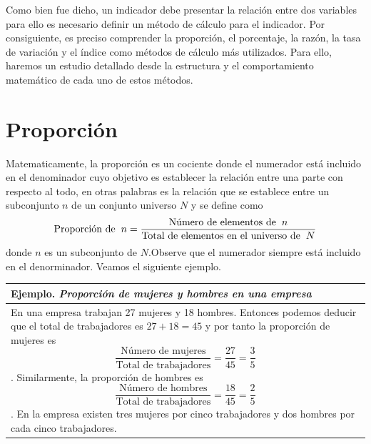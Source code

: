 \documentclass[
]{book}
\begin{document}
Como bien fue dicho, un indicador debe presentar la relación entre dos variables para ello es necesario definir un método de cálculo para el indicador. Por consiguiente, es preciso comprender la proporción, el porcentaje, la razón, la tasa de variación y el índice como métodos de cálculo más utilizados. Para ello, haremos un estudio detallado desde la estructura y el comportamiento matemático de cada uno de estos métodos.

\hypertarget{proporciuxf3n}{%
\chapter{Proporción}\label{proporciuxf3n}}

Matematicamente, la proporción es un cociente donde el numerador está incluido en el denominador cuyo objetivo es establecer la relación entre una parte con respecto al todo, en otras palabras es la relación que se establece entre un subconjunto \(n\) de un conjunto universo \(N\) y se define como
\[\begin{equation}
\text{Proporción de}\hspace{2mm}n=\frac{\text{Número de elementos de}\hspace{2mm}n}{\text{Total de elementos en el universo de}\hspace{2mm} N}
\end{equation}\]
donde \(n\) es un subconjunto de \(N\).Observe que el numerador siempre está incluido en el denorminador. Veamos el siguiente ejemplo.

\begin{longtable}[]{@{}l@{}}
\toprule
\begin{minipage}[b]{0.97\columnwidth}\raggedright
Ejemplo. \emph{Proporción de mujeres y hombres en una empresa}\strut
\end{minipage}\tabularnewline
\midrule
\endhead
\begin{minipage}[t]{0.97\columnwidth}\raggedright
En una empresa trabajan 27 mujeres y 18 hombres. Entonces podemos deducir que el total de trabajadores es \(27+18=45\) y por tanto la proporción de mujeres es \[\frac{\text{Número de mujeres}}{\text{Total de trabajadores}}=\frac{27}{45}=\frac{3}{5}\]. Similarmente, la proporción de hombres es \[\frac{\text{Número de hombres}}{\text{Total de trabajadores}}=\frac{18}{45}=\frac{2}{5}\]. En la empresa existen tres mujeres por cinco trabajadores y dos hombres por cada cinco trabajadores.\strut
\end{minipage}\tabularnewline
\bottomrule
\end{longtable}
\end{document}
